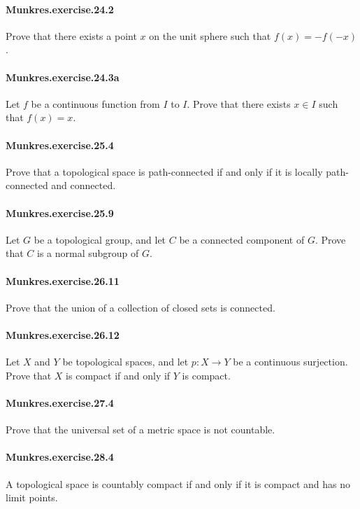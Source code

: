 \documentclass{article}
\begin{document}
\paragraph{Munkres.exercise.24.2} Prove that there exists a point $x$ on the unit sphere such that $f(x) = -f(-x)$.

\paragraph{Munkres.exercise.24.3a} Let $f$ be a continuous function from $I$ to $I$. Prove that there exists $x \in I$ such that $f(x)=x$.

\paragraph{Munkres.exercise.25.4} Prove that a topological space is path-connected if and only if it is locally path-connected and connected.

\paragraph{Munkres.exercise.25.9} Let $G$ be a topological group, and let $C$ be a connected component of $G$. Prove that $C$ is a normal subgroup of $G$.

\paragraph{Munkres.exercise.26.11} Prove that the union of a collection of closed sets is connected.

\paragraph{Munkres.exercise.26.12} Let $X$ and $Y$ be topological spaces, and let $p:X\to Y$ be a continuous surjection. Prove that $X$ is compact if and only if $Y$ is compact.

\paragraph{Munkres.exercise.27.4} Prove that the universal set of a metric space is not countable.

\paragraph{Munkres.exercise.28.4} A topological space is countably compact if and only if it is compact and has no limit points.
\end{document}
